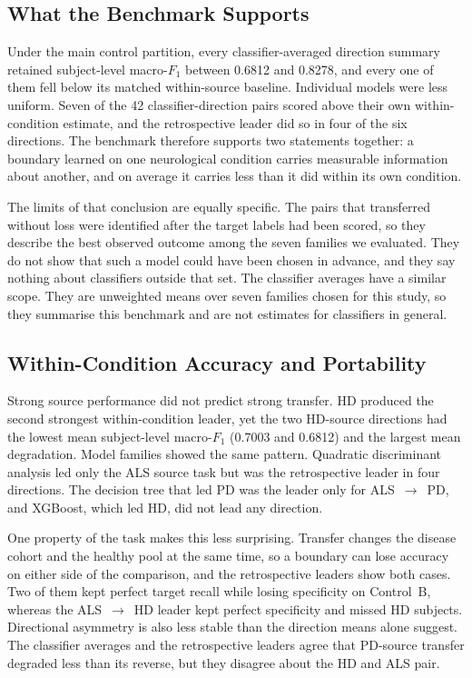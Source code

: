 \documentclass[conference]{IEEEtran}
\begin{document}
\subsection{What the Benchmark Supports}
Under the main control partition, every classifier-averaged direction summary retained subject-level macro-$F_1$ between 0.6812 and 0.8278, and every one of them fell below its matched within-source baseline. Individual models were less uniform. Seven of the 42 classifier-direction pairs scored above their own within-condition estimate, and the retrospective leader did so in four of the six directions. The benchmark therefore supports two statements together: a boundary learned on one neurological condition carries measurable information about another, and on average it carries less than it did within its own condition.

The limits of that conclusion are equally specific. The pairs that transferred without loss were identified after the target labels had been scored, so they describe the best observed outcome among the seven families we evaluated. They do not show that such a model could have been chosen in advance, and they say nothing about classifiers outside that set. The classifier averages have a similar scope. They are unweighted means over seven families chosen for this study, so they summarise this benchmark and are not estimates for classifiers in general.

\subsection{Within-Condition Accuracy and Portability}
Strong source performance did not predict strong transfer. HD produced the second strongest within-condition leader, yet the two HD-source directions had the lowest mean subject-level macro-$F_1$ (0.7003 and 0.6812) and the largest mean degradation. Model families showed the same pattern. Quadratic discriminant analysis led only the ALS source task but was the retrospective leader in four directions. The decision tree that led PD was the leader only for ALS~$\rightarrow$~PD, and XGBoost, which led HD, did not lead any direction.

One property of the task makes this less surprising. Transfer changes the disease cohort and the healthy pool at the same time, so a boundary can lose accuracy on either side of the comparison, and the retrospective leaders show both cases. Two of them kept perfect target recall while losing specificity on Control~B, whereas the ALS~$\rightarrow$~HD leader kept perfect specificity and missed HD subjects. Directional asymmetry is also less stable than the direction means alone suggest. The classifier averages and the retrospective leaders agree that PD-source transfer degraded less than its reverse, but they disagree about the HD and ALS pair.
\end{document}
